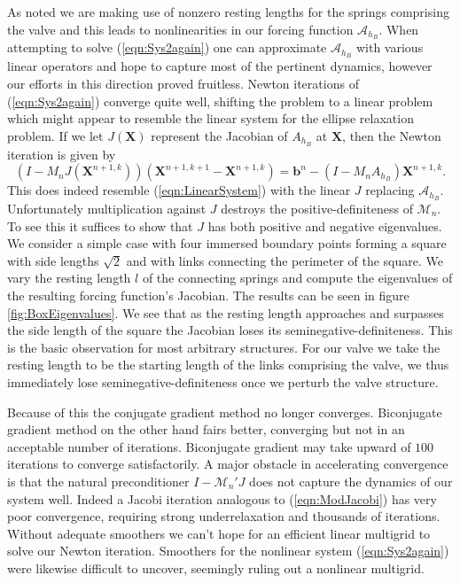 \documentclass[preprint,12pt]{elsarticle}
\begin{document}
As noted we are making use of nonzero resting lengths for the springs comprising the valve and this leads to nonlinearities in our forcing function $\mathcal{A}_{h_B}$.
When attempting to solve (\ref{eqn:Sys2again}) one can approximate $\mathcal{A}_{h_B}$ with various linear operators and hope to capture most of the pertinent dynamics, however our efforts in this direction proved fruitless. Newton iterations of (\ref{eqn:Sys2again}) converge quite well, shifting the problem to a linear problem which might appear to resemble the linear system for the ellipse relaxation problem. If we let $J(\mathbf{X})$ represent the Jacobian of $\mathit{A}_{h_B}$ at $\mathbf{X}$, then the Newton iteration is given by
\begin{equation}
(\mathit{I}-\mathit{M}_n\mathit{J}(\mathbf{X}^{n+1,k}))(\mathbf{X}^{n+1,k+1}-\mathbf{X}^{n+1,k})
= \mathbf{b}^n - (\mathit{I}-\mathit{M}_n\mathit{A}_{h_B})\mathbf{X}^{n+1,k}.
\label{eqn:NewtonIt}
\end{equation}
This does indeed resemble (\ref{eqn:LinearSystem}) with the linear $J$ replacing $\mathcal{A}_{h_B}$. Unfortunately multiplication against $J$ destroys the positive-definiteness of $\mathcal{M}_n$. To see this it suffices to show that $J$ has both positive and negative eigenvalues. We consider a simple case with four immersed boundary points forming a square with side lengths $\sqrt{2}$ and with links connecting the perimeter of the square. We vary the resting length $l$ of the connecting springs and compute the eigenvalues of the resulting forcing function's Jacobian. The results can be seen in figure \ref{fig:BoxEigenvalues}. We see that as the resting length approaches and surpasses the side length of the square the Jacobian loses its seminegative-definiteness. This is the basic observation for most arbitrary structures. For our valve we take the resting length to be the starting length of the links comprising the valve, we thus immediately lose seminegative-definiteness once we perturb the valve structure.

Because of this the conjugate gradient method no longer converges. Biconjugate gradient method on the other hand fairs better, converging but not in an acceptable number of iterations. Biconjugate gradient may take upward of $100$ iterations to converge satisfactorily. A major obstacle in accelerating convergence is that the natural preconditioner $I-\mathcal{M}_n'J$ does not capture the dynamics of our system well. Indeed a Jacobi iteration analogous to (\ref{eqn:ModJacobi}) has very poor convergence, requiring strong underrelaxation and thousands of iterations. Without adequate smoothers we can't hope for an efficient linear multigrid to solve our Newton iteration. Smoothers for the nonlinear system (\ref{eqn:Sys2again}) were likewise difficult to uncover, seemingly ruling out a nonlinear multigrid.
\end{document}
